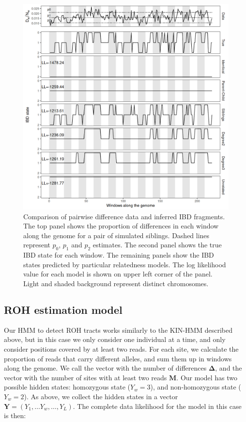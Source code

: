 \documentclass[12pt, letterpaper]{article}
\begin{document}
\begin{figure}[h!]
    \includegraphics[width=16cm]{plots/plotimg/IBDplot.png}
    \centering
    \caption{Comparison of pairwise difference data and inferred IBD fragments. The top panel shows the proportion of differences in each window along the genome for a pair of simulated siblings. Dashed lines represent $p_0$, $p_1$ and $p_2$ estimates. The second panel shows the true IBD state for each window. The remaining panels show the IBD states predicted by particular relatedness models. The log likelihood value for each model is shown on upper left corner of the panel. Light and shaded background represent distinct chromosomes.}
    \label{fig1:ibd}
\end{figure}

\subsection{ROH estimation model}\label{roh}
Our HMM to detect ROH tracts works similarly to the KIN-HMM described above, but in this case we only consider one individual at a time, and only consider positions covered by at least two reads. For each site, we calculate the proportion of reads that carry different alleles, and sum them up in windows along the genome. We call the vector with the number of differences $\mathbf{\Delta}$, and the vector with the number of sites with at least two reads $\mathbf{M}$. Our model has two possible hidden states: homozygous state ($Y_w=3$), and non-homozygous state ($Y_w=2$). As above, we collect the hidden states in a vector $\mathbf{Y} = (Y_1, \dots Y_w, \dots, Y_L)$. The complete data likelihood for the model in this case is then:
\end{document}
